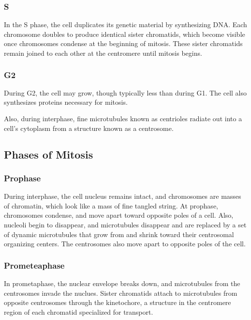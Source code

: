 \documentclass[12pt,titlepage]{article}
\begin{document}
      \subsubsection{S}
        In the S phase, the cell duplicates its genetic material by synthesizing DNA. Each chromosome doubles to produce identical sister chromatids, which become
        visible once chromosomes condense at the beginning of mitosis. These sister chromatids remain joined to each other at the centromere until mitosis begins.

      \subsubsection{G2}
        During G2, the cell may grow, though typically less than during G1. The cell also synthesizes proteins necessary for mitosis.

      Also, during interphase, fine microtubules known as centrioles radiate out into a cell's cytoplasm from a structure known as a centrosome.

    \subsection{Phases of Mitosis}

      \subsubsection{Prophase}
        During interphase, the cell nucleus remains intact, and chromosomes are masses of chromatin, which look like a mass of fine tangled string. At prophase,
        chromosomes condense, and move apart toward opposite poles of a cell. Also, nucleoli begin to disappear, and microtubules disappear and are replaced by a
        set of dynamic microtubules that grow from and shrink toward their centrosomal organizing centers. The centrosomes also move apart to opposite poles of the
        cell.

      \subsubsection{Prometeaphase}
        In prometaphase, the nuclear envelope breaks down, and microtubules from the centrosomes invade the nuclues. Sister chromatids attach to microtubules from
        opposite centrosomes through the kinetochore, a structure in the centromere region of each chromatid specialized for transport.
\end{document}
